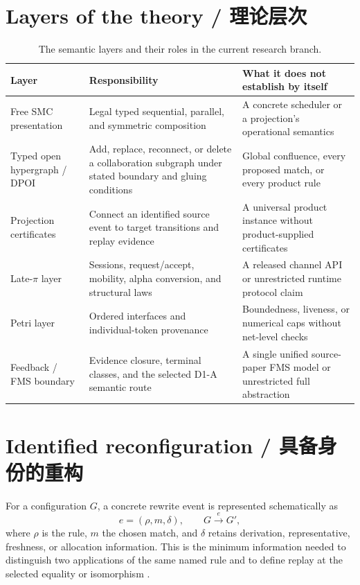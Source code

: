 \label{ch:architecture}

\section{Layers of the theory / 理论层次}

\begin{table}[H]
\centering
\caption{The semantic layers and their roles in the current research branch.}
\label{tab:components}
\begin{tabularx}{\textwidth}{@{}L{0.23\textwidth}L{0.31\textwidth}Y@{}}
\toprule
{}
\textbf{Layer} & \textbf{Responsibility} & \textbf{What it does not establish by itself} \\
\midrule
Free SMC presentation & Legal typed sequential, parallel, and symmetric composition & A concrete scheduler or a projection's operational semantics \\
Typed open hypergraph / DPOI & Add, replace, reconnect, or delete a collaboration subgraph under stated boundary and gluing conditions & Global confluence, every proposed match, or every product rule \\
Projection certificates & Connect an identified source event to target transitions and replay evidence & A universal product instance without product-supplied certificates \\
Late-\(\pi\) layer & Sessions, request/accept, mobility, alpha conversion, and structural laws & A released channel API or unrestricted runtime protocol claim \\
Petri layer & Ordered interfaces and individual-token provenance & Boundedness, liveness, or numerical caps without net-level checks \\
Feedback / FMS boundary & Evidence closure, terminal classes, and the selected D1-A semantic route & A single unified source-paper FMS model or unrestricted full abstraction \\
\bottomrule
\end{tabularx}
\end{table}

\section{Identified reconfiguration / 具备身份的重构}

For a configuration \(G\), a concrete rewrite event is represented schematically as
\begin{equation}
  e=(\rho,m,\delta),\qquad G\xrightarrow{e}G',
  \label{eq:identified-event}
\end{equation}
where \(\rho\) is the rule, \(m\) the chosen match, and \(\delta\) retains derivation,
representative, freshness, or allocation information. This is the minimum information needed to
distinguish two applications of the same named rule and to define replay at the selected equality
or isomorphism \citep{cantiluneSpec}.

